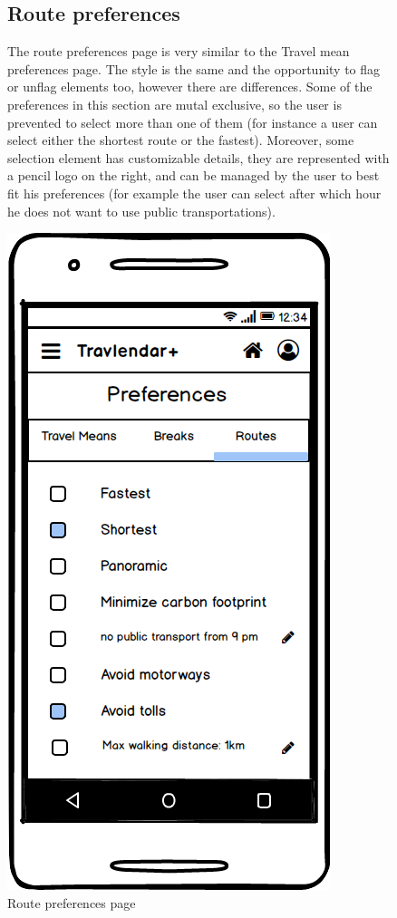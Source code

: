 		\begin{figure}
				\begin{flushleft}
				\subsection{Route preferences}
				The route preferences page is very similar to the Travel mean preferences page. The style is the same and the opportunity to flag or unflag elements too, however there are differences. Some of the preferences in this section are mutal exclusive, so the user is prevented to select more than one of them (for instance a user can select either the shortest route or the fastest). Moreover, some selection element has customizable details, they are represented with a pencil logo on the right, and can be managed by the user to best fit his preferences (for example the user can select after which hour he does not want to use public transportations).
			\end{flushleft}
		\centering
		\includegraphics[width=0.5\linewidth]{mockups/PreferencesRoutes}
		\caption{Route preferences page}
		\label{fig:preferencesroutes}
		
	\end{figure}
	